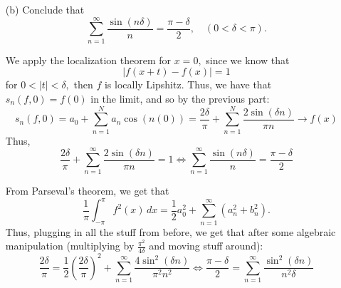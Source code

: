 \documentclass[11pt]{article}
\begin{document}
\begin{itemize}
\begin{solution}
\end{solution}  
    \item[(b)] Conclude that
    \[
    \sum_{n=1}^{\infty} \frac{\sin (n\delta)}{n} = \frac{\pi - \delta}{2}, \quad (0 < \delta < \pi).
    \]
    \begin{solution}
    We apply the localization theorem for $x = 0,$ since we know that \[|f(x + t) - f(x)|= 1\] for $0<|t|< \delta,$ then $f$ is locally Lipshitz. Thus, we have that $s_n(f,0) = f(0)$ in the limit, and so by the previous part:
    \[s_n(f,0) =a_0  + \sum_{n=1}^N a_n \cos(n(0)) = \frac{2\delta}{\pi} + \sum_{n=1}^N\frac{2\sin(\delta n)}{\pi n} \to f(x)\]
        Thus, 
        \[ \frac{2\delta}{\pi} + \sum_{n=1}^\infty\frac{2\sin(\delta n)}{\pi n}= 1 \iff \sum_{n=1}^{\infty} \frac{\sin (n\delta)}{n} = \frac{\pi - \delta}{2}\]
    \end{solution}
    \begin{solution}
        From Parseval's theorem, we get that 
        \[
\frac{1}{\pi} \int_{-\pi}^{\pi} f^2(x) \, dx = \frac{1}{2} a_0^2 + \sum_{n=1}^{\infty} \left( a_n^2 + b_n^2 \right).
\]
Thus, plugging in all the stuff from before, we get that after some algebraic manipulation (multiplying by $\frac{\pi^2}{4\delta}$ and moving stuff around):
\[\frac{2\delta}{\pi} = \frac{1}{2}(\frac{2\delta}{\pi})^2 + \sum_{n=1}^\infty \frac{4\sin^2(\delta n)}{\pi^2 n^2} \iff \frac{\pi - \delta}{2} = \sum_{n=1}^\infty \frac{\sin^2(\delta n)}{n^2 \delta}\]
    \end{solution}
    

\end{itemize}
\end{document}
